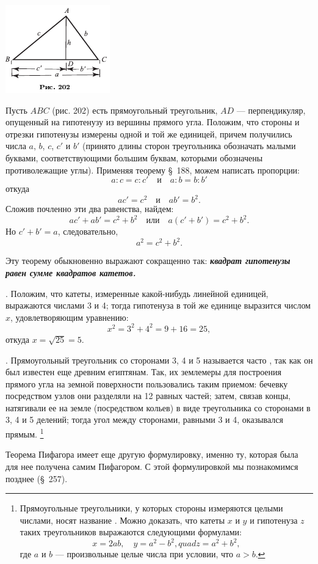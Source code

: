 \documentclass[oneside]{book}
\begin{document}
\includegraphics{pics/ris-202}

Пусть $ABC$ (рис. 202) есть прямоугольный треугольник, $AD$ — перпендикуляр, опущенный на гипотенузу из вершины прямого угла.
Положим, что стороны и отрезки гипотенузы измерены одной и той же единицей, причем получились числа $a$, $b$, $c$, $c'$ и $b'$ (принято длины сторон треугольника обозначать малыми буквами, соответствующими большим буквам, которыми обозначены противолежащие углы).
Применяя теорему §~188, можем написать пропорции:
\[a:c=c:c'
\quad\text{и}\quad
a:b=b:b'\]
откуда 
\[ac'=c^2
\quad\text{и}\quad
ab'=b^2.\]
Сложив почленно эти два равенства, найдем:
\[ac'+ab'=c^2+b^2
\quad\text{или}\quad
a(c'+b')=c^2+b^2.\]
Но $c'+b'=a$, следовательно,
\[a^2=c^2+b^2.\]

Эту теорему обыкновенно выражают сокращенно так:
\textbf{\emph{квадрат гипотенузы равен сумме квадратов катетов.}}

.
Положим, что катеты, измеренные какой-нибудь линейной единицей, выражаются числами 3 и 4;
тогда гипотенуза в той же единице выразится числом $x$, удовлетворяющим уравнению:
\[x^2=3^2+4^2=9+16=25,\]
откуда $x = \sqrt{25} = 5$.

.
Прямоугольный треугольник со сторонами 3, 4 и 5 называется часто , так как он был известен еще древним египтянам.
Так, их землемеры для построения прямого угла на земной поверхности пользовались таким приемом:
бечевку посредством узлов они разделяли на 12 равных частей;
затем, связав концы, натягивали ее на земле (посредством кольев) в виде треугольника со сторонами в 3, 4 и 5 делений;
тогда угол между сторонами, равными 3 и 4, оказывался прямым.%
\footnote{Прямоугольные треугольники, у которых стороны измеряются целыми числами, носят название .
Можно доказать, что катеты $x$ и $y$ и гипотенуза $z$ таких треугольников выражаются следующими формулами:
\[x=2ab,
\quad
y=a^2-b^2,
quad
z=a^2+b^2,\]
где $a$ и $b$ — произвольные целые числа при условии, что $a>b$.}

Теорема Пифагора имеет еще другую формулировку, именно ту, которая была для нее получена самим Пифагором.
С этой формулировкой мы познакомимся позднее (§~257).
\end{document}
